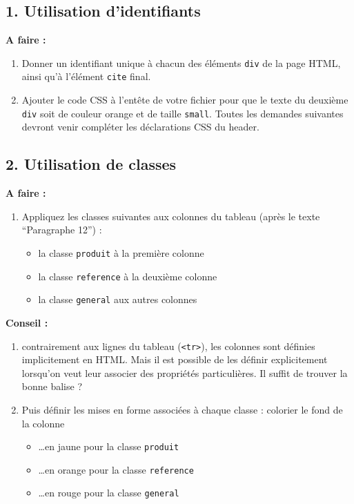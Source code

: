 \documentclass[a4paper,11pt]{article}
\begin{document}
\subsection{1. Utilisation d'identifiants}

\begin{afaire}
\textbf{A faire :}

\begin{enumerate}
    \item Donner un identifiant unique à chacun des éléments \textcolor{rose}{\texttt{div}} de la page HTML, ainsi qu'à l'élément \textcolor{rose}{\texttt{cite}} final.
    \item Ajouter le code CSS à l'entête de votre fichier pour que le texte du deuxième \textcolor{rose}{\texttt{div}} soit de couleur orange et de taille \texttt{small}. Toutes les demandes suivantes devront venir compléter les déclarations CSS du header.
\end{enumerate}
\end{afaire}

\subsection{2. Utilisation de classes}

\begin{afaire}
\textbf{A faire :}

\begin{enumerate}
    \item Appliquez les classes suivantes aux colonnes du tableau (après le texte ``Paragraphe 12'') :
    \begin{itemize}
        \item la classe \textcolor{rose}{\texttt{produit}} à la première colonne
        \item la classe \textcolor{rose}{\texttt{reference}} à la deuxième colonne
        \item la classe \textcolor{rose}{\texttt{general}} aux autres colonnes
    \end{itemize}
\end{enumerate}

\textcolor{rougetitre}{\textbf{Conseil :}}
\begin{enumerate}
    \item contrairement aux lignes du tableau (\texttt{<tr>}), les colonnes sont définies implicitement en HTML. Mais il est possible de les définir explicitement lorsqu'on veut leur associer des propriétés particulières. Il suffit de trouver la bonne balise ?
    \item Puis définir les mises en forme associées à chaque classe : colorier le fond de la colonne
    \begin{itemize}
        \item \ldots en jaune pour la classe \textcolor{rose}{\texttt{produit}}
        \item \ldots en orange pour la classe \textcolor{rose}{\texttt{reference}}
        \item \ldots en rouge pour la classe \textcolor{rose}{\texttt{general}}
    \end{itemize}
\end{enumerate}
\end{afaire}
\end{document}
